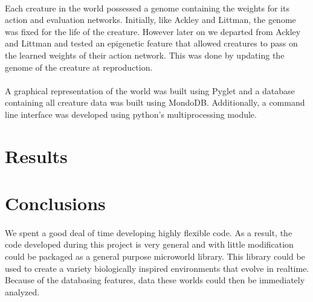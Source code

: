 \documentclass[12pt]{report}
\begin{document}
\paragraph{} Each creature in the world possessed a genome containing the weights for its action and evaluation networks. Initially, like Ackley and Littman, the genome was fixed for the life of the creature. However later on we departed from Ackley and Littman and tested an epigenetic feature that allowed creatures to pass on the learned weights of their action network. This was done by updating the genome of the creature at reproduction.  
\paragraph{} A graphical representation of the world was built using Pyglet and a database containing all creature data was built using MondoDB. Additionally, a command line interface was developed using python's multiprocessing module.
\section*{Results}

\begin{center}
\end{center}


\section*{Conclusions}
\paragraph{} 
We spent a good deal of time developing highly flexible code. As a result,  the code developed during this project is very general and with little modification could be packaged as a general purpose microworld  library. This library could be used to create a variety biologically inspired environments that evolve in realtime. Because of the databasing features, data these worlds could then be immediately analyzed.  
\end{document}
